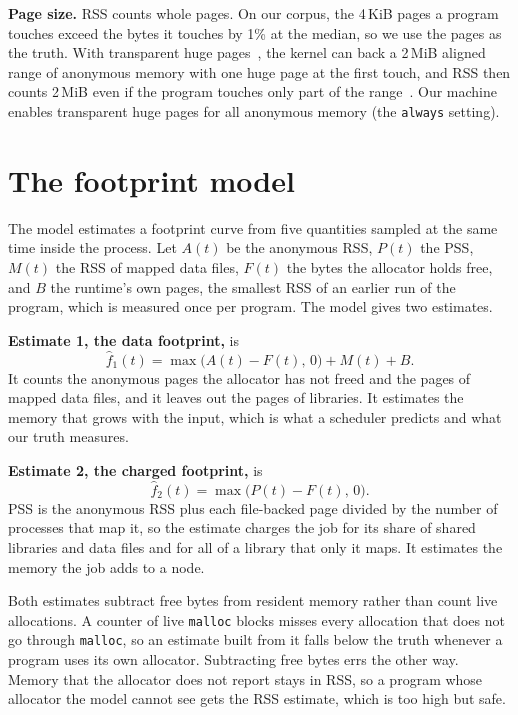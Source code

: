 \documentclass[11pt]{article}
\begin{document}
\textbf{Page size.} RSS counts whole pages. On our corpus, the 4\,KiB pages a program touches exceed the bytes it
touches by 1\% at the median, so we use the pages as the truth. With transparent huge pages~\cite{LinuxTHP}, the
kernel can back a 2\,MiB aligned range of anonymous memory with one huge page at the first touch, and RSS then counts
2\,MiB even if the program touches only part of the range~\cite{Kwon2016Ingens,Panwar2019HawkEye}. Our machine
enables transparent huge pages for all anonymous memory (the \texttt{always} setting).

\section{The footprint model}
\label{sec:model}

The model estimates a footprint curve from five quantities sampled at the same time inside the process. Let $A(t)$
be the anonymous RSS, $P(t)$ the PSS, $M(t)$ the RSS of mapped data files, $F(t)$ the bytes the allocator holds
free, and $B$ the runtime's own pages, the smallest RSS of an earlier run of the program, which is measured once per
program. The model gives two estimates.

\textbf{Estimate 1, the data footprint,} is
\begin{equation}
\hat{f}_1(t) = \max\bigl(A(t) - F(t),\,0\bigr) + M(t) + B .
\end{equation}
It counts the anonymous pages the allocator has not freed and the pages of mapped data files, and it leaves out the
pages of libraries. It estimates the memory that grows with the input, which is what a scheduler predicts and what
our truth measures.

\textbf{Estimate 2, the charged footprint,} is
\begin{equation}
\hat{f}_2(t) = \max\bigl(P(t) - F(t),\,0\bigr) .
\end{equation}
PSS is the anonymous RSS plus each file-backed page divided by the number of processes that map it, so the estimate
charges the job for its share of shared libraries and data files and for all of a library that only it maps. It
estimates the memory the job adds to a node.

Both estimates subtract free bytes from resident memory rather than count live allocations. A counter of live
\texttt{malloc} blocks misses every allocation that does not go through \texttt{malloc}, so an estimate built from it
falls below the truth whenever a program uses its own allocator. Subtracting free bytes errs the other way. Memory
that the allocator does not report stays in RSS, so a program whose allocator the model cannot see gets the RSS
estimate, which is too high but safe.
\end{document}
